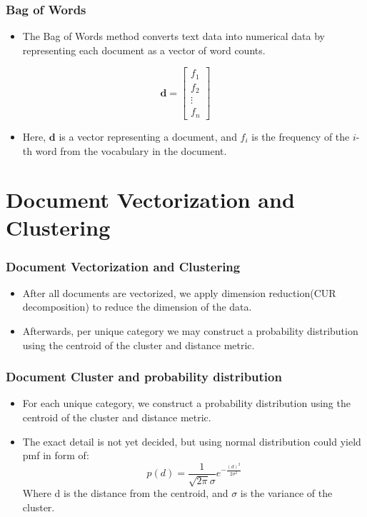 \documentclass[
    10pt %
    16:9, %
]{beamer}
\begin{document}
\begin{frame}
  \frametitle{Bag of Words}
  \begin{itemize}
    \item The Bag of Words method converts text data into numerical data by representing each document as a vector of word counts.
  \end{itemize}
  \[
    \mathbf{d} = \begin{bmatrix}
    f_1 \\
    f_2 \\
    \vdots \\
    f_n
  \end{bmatrix}
  \]
  \begin{itemize}
    \item Here, \(\mathbf{d}\) is a vector representing a document, and \(f_i\) is the frequency of the \(i\)-th word from the vocabulary in the document.
  \end{itemize}
\end{frame}


\section{Document Vectorization and Clustering}
\begin{frame}
  \frametitle{Document Vectorization and Clustering}
  \begin{itemize}
    \item After all documents are vectorized, we apply dimension reduction(CUR decomposition) to reduce the dimension of the data.
    \item Afterwards, per unique category we may construct a probability distribution using the centroid of the cluster and distance metric.
  \end{itemize}

\end{frame}

\begin{frame}
  \frametitle{Document Cluster and probability distribution}
  \begin{itemize}
    \item For each unique category, we construct a probability distribution using the centroid of the cluster and distance metric.
    \item The exact detail is not yet decided, but using normal distribution could yield pmf in form of:
    \[
      p(d) = \frac{1}{\sqrt{2\pi}\sigma}e^{-\frac{(d)^2}{2\sigma^2}}
    \]
    Where d is the distance from the centroid, and \(\sigma\) is the variance of the cluster.
  \end{itemize}
\end{frame}
\end{document}
